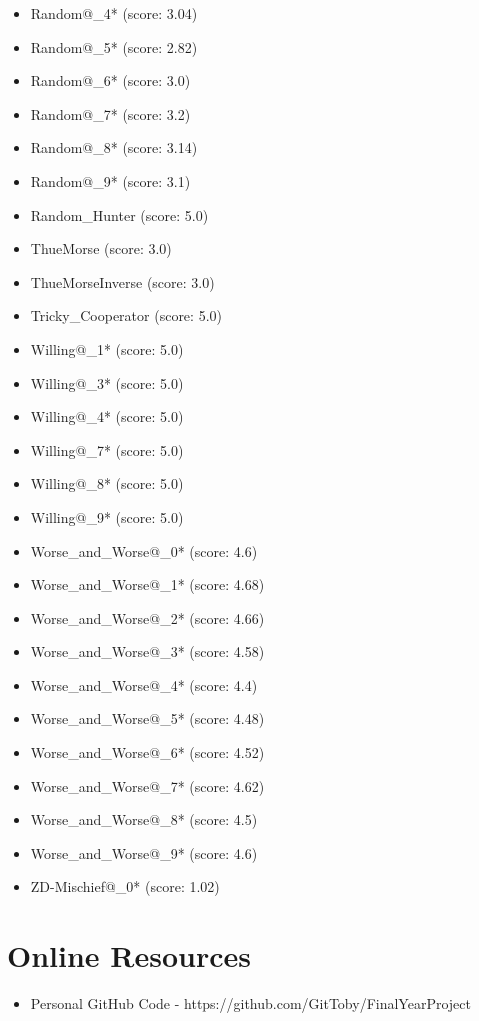 \begin{appendices}
\begin{itemize}
\begin{multicols}{3}
\begin{itemize}
            \item Random@\_4* (score: 3.04)
            \item Random@\_5* (score: 2.82)
            \item Random@\_6* (score: 3.0)
            \item Random@\_7* (score: 3.2)
            \item Random@\_8* (score: 3.14)
            \item Random@\_9* (score: 3.1)
            \item Random\_Hunter (score: 5.0)
            \item ThueMorse (score: 3.0)
            \item ThueMorseInverse (score: 3.0)
            \item Tricky\_Cooperator (score: 5.0)
            \item Willing@\_1* (score: 5.0)
            \item Willing@\_3* (score: 5.0)
            \item Willing@\_4* (score: 5.0)
            \item Willing@\_7* (score: 5.0)
            \item Willing@\_8* (score: 5.0)
            \item Willing@\_9* (score: 5.0)
            \item Worse\_and\_Worse@\_0* (score: 4.6)
            \item Worse\_and\_Worse@\_1* (score: 4.68)
            \item Worse\_and\_Worse@\_2* (score: 4.66)
            \item Worse\_and\_Worse@\_3* (score: 4.58)
            \item Worse\_and\_Worse@\_4* (score: 4.4)
            \item Worse\_and\_Worse@\_5* (score: 4.48)
            \item Worse\_and\_Worse@\_6* (score: 4.52)
            \item Worse\_and\_Worse@\_7* (score: 4.62)
            \item Worse\_and\_Worse@\_8* (score: 4.5)
            \item Worse\_and\_Worse@\_9* (score: 4.6)
            \item ZD-Mischief@\_0* (score: 1.02)
        \end{itemize}
     \end{multicols}
     
    \end{itemize}
    
\chapter{Online Resources}\label{apndx:resources}
\begin{itemize}
    \item Personal GitHub Code - https://github.com/GitToby/FinalYearProject
\end{itemize}

\end{appendices}